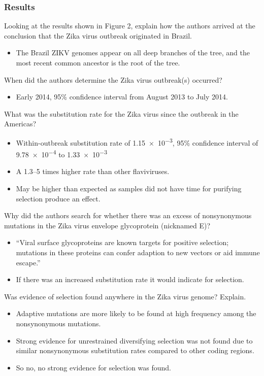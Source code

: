 \documentclass[12pt,a4paper]{article}
\begin{document}
\subsubsection{Results}
\begin{itemize}
    {\color{G-Moon}\item Looking at the results shown in Figure 2, explain how the authors arrived at the conclusion that the Zika virus outbreak originated in Brazil.}
        \begin{itemize}
            \item The Brazil ZIKV genomes appear on all deep branches of the tree, and the most recent common ancestor is the root of the tree.
        \end{itemize}
    {\color{G-Moon}\item When did the authors determine the Zika virus outbreak(s) occurred?} %
        \begin{itemize}
            \item Early 2014, 95\% confidence interval from August 2013 to July 2014.
        \end{itemize}
    {\color{G-Moon}\item What was the substitution rate for the Zika virus since the outbreak in the Americas?}
        \begin{itemize}
            \item Within-outbreak substitution rate of \num{1.15e-3},  95\% confidence interval of \num{9.78e-4} to \num{1.33e-3}
            \item A 1.3--5 times higher rate than other flaviviruses.
            \item May be higher than expected as samples did not have time for purifying selection produce an effect.
        \end{itemize}
    {\color{G-Moon}\item Why did the authors search for whether there was an excess of nonsynonymous mutations in the Zika virus envelope glycoprotein (nicknamed E)?}
        \begin{itemize}
            \item ``Viral surface glycoproteins are known targets for positive selection; mutations in these proteins can confer adaption to new vectors or aid immune escape.''
            \item If there was an increased substitution rate it would indicate for selection.
        \end{itemize}
    {\color{G-Moon}\item Was evidence of selection found anywhere in the Zika virus genome? Explain.}
        \begin{itemize}
            \item Adaptive mutations are more likely to be found at high frequency among the nonsynonymous mutations.
            \item Strong evidence for unrestrained diversifying selection was not found due to similar nonsynonymous substitution rates compared to other coding regions.
            \item So no, no strong evidence for selection was found.
        \end{itemize}
\end{itemize}
\end{document}
